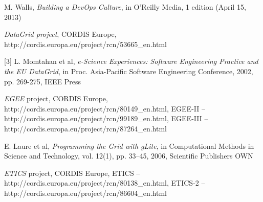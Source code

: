 \documentclass[journal]{IEEEtran}
\begin{document}
%
%
%
\begin{thebibliography}{1}

M. Walls, \emph{Building a DevOps Culture}, in O'Reilly Media, 1 edition (April 15, 2013)

\emph{DataGrid project}, CORDIS Europe, http://cordis.europa.eu/project/rcn/53665\_en.html

[3] L. Momtahan et al, \emph{e-Science Experiences: Software Engineering Practice and the EU DataGrid}, in Proc. Asia-Pacific Software Engineering Conference, 2002, pp. 269-275, IEEE Press

\emph{EGEE} project, CORDIS Europe, http://cordis.europa.eu/project/rcn/80149\_en.html, EGEE-II -- http://cordis.europa.eu/project/rcn/99189\_en.html, EGEE-III -- http://cordis.europa.eu/project/rcn/87264\_en.html
%
%
%

E. Laure et al, \emph{Programming the Grid with gLite}, in Computational Methods in Science and Technology, vol. 12(1), pp. 33–45, 2006, Scientific Publishers OWN

\emph{ETICS} project, CORDIS Europe, ETICS -- http://cordis.europa.eu/project/rcn/80138\_en.html, ETICS-2 -- http://cordis.europa.eu/project/rcn/86604\_en.html
%


\end{thebibliography}
\end{document}
